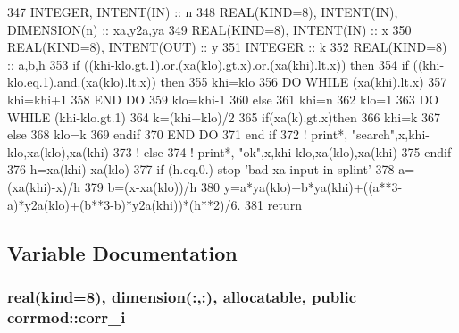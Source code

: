 \begin{DoxyCode}
347     \textcolor{keywordtype}{INTEGER}, \textcolor{keywordtype}{INTENT(IN)} :: n
348     \textcolor{keywordtype}{REAL(KIND=8)}, \textcolor{keywordtype}{INTENT(IN)}, \textcolor{keywordtype}{DIMENSION(n)} :: xa,y2a,ya
349     \textcolor{keywordtype}{REAL(KIND=8)}, \textcolor{keywordtype}{INTENT(IN)} :: x
350     \textcolor{keywordtype}{REAL(KIND=8)}, \textcolor{keywordtype}{INTENT(OUT)} :: y
351     \textcolor{keywordtype}{INTEGER} :: k
352     \textcolor{keywordtype}{REAL(KIND=8)} :: a,b,h
353     \textcolor{keywordflow}{if} ((khi-klo.gt.1).or.(xa(klo).gt.x).or.(xa(khi).lt.x)) \textcolor{keywordflow}{then}
354        \textcolor{keywordflow}{if} ((khi-klo.eq.1).and.(xa(klo).lt.x)) \textcolor{keywordflow}{then}
355           khi=klo
356           \textcolor{keywordflow}{DO} \textcolor{keywordflow}{WHILE} (xa(khi).lt.x)
357              khi=khi+1
358 \textcolor{keywordflow}{          END DO}
359           klo=khi-1
360        \textcolor{keywordflow}{else}
361           khi=n
362           klo=1
363           \textcolor{keywordflow}{DO} \textcolor{keywordflow}{WHILE} (khi-klo.gt.1)
364              k=(khi+klo)/2
365              \textcolor{keywordflow}{if}(xa(k).gt.x)\textcolor{keywordflow}{then}
366                 khi=k
367              \textcolor{keywordflow}{else}
368                 klo=k
369 \textcolor{keywordflow}{             endif}
370 \textcolor{keywordflow}{          END DO}
371 \textcolor{keywordflow}{       end if}
372     \textcolor{comment}{!    print*, "search",x,khi-klo,xa(klo),xa(khi)}
373     \textcolor{comment}{! else}
374     \textcolor{comment}{!    print*, "ok",x,khi-klo,xa(klo),xa(khi)}
375 \textcolor{keywordflow}{    endif}
376     h=xa(khi)-xa(klo)
377     \textcolor{keywordflow}{if} (h.eq.0.) stop \textcolor{stringliteral}{'bad xa input in splint'}
378     a=(xa(khi)-x)/h
379     b=(x-xa(klo))/h
380     y=a*ya(klo)+b*ya(khi)+((a**3-a)*y2a(klo)+(b**3-b)*y2a(khi))*(h**2)/6.
381     \textcolor{keywordflow}{return}
\end{DoxyCode}


\subsection{Variable Documentation}
\subsubsection[{\texorpdfstring{corr\+\_\+i}{corr_i}}]{\setlength{\rightskip}{0pt plus 5cm}real(kind=8), dimension(\+:,\+:), allocatable, public corrmod\+::corr\+\_\+i}\hypertarget{namespacecorrmod_a859a67113b5271db0df70e60cbf0687b}{}\label{namespacecorrmod_a859a67113b5271db0df70e60cbf0687b}



